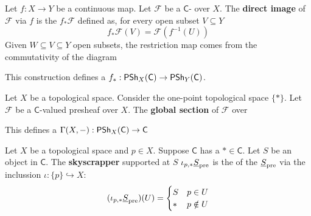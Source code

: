 \documentclass[../main.tex]{subfiles}
\begin{document}
\begin{definition} \label{def:direct-image-presheaf}
  Let \(f: X \to Y\) be a continuous map.
  Let \(\mathcal{F}\) be a \(\mathsf{C}\)- over \(X\).
  The \textbf{direct image } of \(\mathcal{F}\) via \(f\) is the  \(f_{\ast}\mathcal{F}\) defined as, for every open subset \(V \subseteq Y\)
  \begin{equation*}
    f_{\ast}\mathcal{F}(V) = \mathcal{F}(f^{-1}(U))
  \end{equation*}
  Given \(W \subseteq V \subseteq Y\) open subsets, the restriction map comes from the commutativity of the diagram
  \begin{center}
  \end{center}

  This construction defines a  \(f_{\ast}: \mathsf{PSh}_{X}(\mathsf{C}) \to \mathsf{PSh}_{Y}(\mathsf{C})\).
\end{definition}



\begin{example} \label{ex:global-section-presheaf}
  Let \(X\) be a topological space.
  Consider the one-point topological space \(\{\ast\}\).
  Let \(\mathcal{F}\) be a \(\mathsf{C}\)-valued presheaf over \(X\).
  The \textbf{global section} of \(\mathcal{F}\) over

  This defines a  \(\Gamma(X, -): \mathsf{PSh}_{X}(\mathsf{C}) \to \mathsf{C}\)
\end{example}

\begin{example} \label{ex:skyscrapper-presheaf}
  Let \(X\) be a topological space and \(p \in X\).
  Suppose \(\mathsf{C}\) has a  \(\ast \in \mathsf{C}\).
  Let \(S\) be an object in \(\mathsf{C}\).
  The \textbf{skyscrapper } supported at \(S\) \(\iota_{p, \ast}\underline{S}_{\operatorname*{pre}}\) is the  of the  \(\underline{S}_{\operatorname*{pre}}\) via the inclussion \(\iota: \{p\} \hookrightarrow X\):
  \begin{equation*}
    (\iota_{p, \ast}\underline{S}_{\operatorname*{pre}})(U) = \begin{cases}
      S & p \in U \\
      \ast & p \notin U
    \end{cases}
  \end{equation*}
\end{example}
\end{document}
